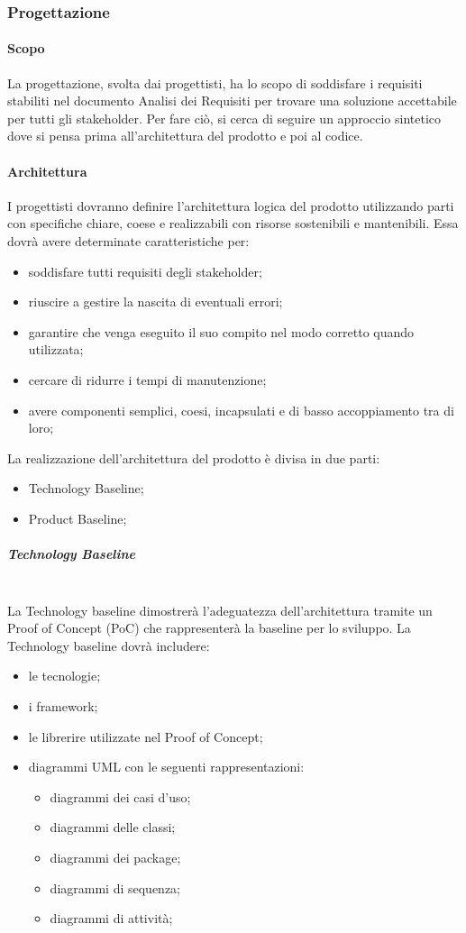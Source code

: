 
	\subsubsection{Progettazione}
	\paragraph{Scopo}
	La progettazione, svolta dai progettisti, ha lo scopo di soddisfare i requisiti stabiliti nel documento Analisi dei Requisiti per trovare una soluzione accettabile per tutti gli stakeholder.
	Per fare ciò, si cerca di seguire un approccio sintetico dove si pensa prima all’architettura del prodotto e poi al codice.
	\paragraph{Architettura}	I progettisti dovranno definire l’architettura logica del prodotto utilizzando parti con specifiche chiare, coese e realizzabili con risorse sostenibili e mantenibili. Essa dovrà avere determinate caratteristiche per:
	\begin{itemize}
		\item	soddisfare tutti requisiti degli stakeholder;
		\item	riuscire a gestire la nascita di eventuali errori;
		\item	garantire che venga eseguito il suo compito nel modo corretto quando utilizzata;
		\item	cercare di ridurre i tempi di manutenzione;
		\item   avere componenti semplici, coesi, incapsulati e di basso accoppiamento tra di loro;
	\end{itemize}
	La realizzazione dell’architettura del prodotto è divisa in due parti:
	\begin{itemize}
		\item Technology Baseline;
		\item Product Baseline;
	\end{itemize}
	\subparagraph{Technology Baseline}\mbox{}\\
	La Technology baseline dimostrerà l’adeguatezza dell’architettura tramite un Proof of Concept (PoC) che rappresenterà la baseline per lo sviluppo. 
	La Technology baseline dovrà includere:
	\begin{itemize}
		\item le tecnologie;
		\item i framework;
		\item le librerire utilizzate nel Proof of Concept;
		\item diagrammi UML con le seguenti rappresentazioni:
		\begin{itemize}
			\item 	diagrammi dei casi d’uso; 
			\item 	diagrammi delle classi; 
			\item 	diagrammi dei package;
			\item 	diagrammi di sequenza; 
			\item 	diagrammi di attività;
		\end{itemize}
	\end{itemize}
